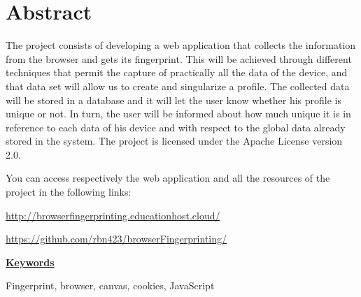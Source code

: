\chapter*{Abstract}

The project consists of developing a web application that collects the information from the browser and gets its fingerprint. This will be achieved through different techniques that permit the capture of practically all the data of the device, and that data set will allow us to create and singularize a profile. The collected data will be stored in a database and it will let the user know whether his profile is unique or not. In turn, the user will be informed about how much unique it is in reference to each data of his device and with respect to the global data already stored in the system. The project is licensed under the Apache License version 2.0. \par

\noindent
You can access respectively the web application and all the resources of the project in the following links: \par
\url{http://browserfingerprinting.educationhost.cloud/} \par

\url{https://github.com/rbn423/browserFingerprinting/} \par
\vspace{12mm}
\noindent
\underline{\Large{\textbf{Keywords}}}\par
\vspace{7mm}
\noindent
\normalsize{Fingerprint, browser, canvas, cookies, JavaScript}